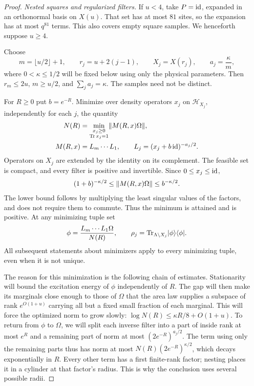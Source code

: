 \begin{proof}
\emph{Nested squares and regularized filters.}
If \(u<4\), take \(P=\operatorname{id}\), expanded in an orthonormal basis on
\(X(u)\).  That set has at most \(81\) sites, so the expansion has
at most \(q^{81}\) terms.  This also covers empty square samples.
We henceforth suppose \(u\geq4\).

Choose
\[
 m=\lfloor u/2\rfloor+1,\qquad
 r_j=u+2(j-1),\qquad X_j=X(r_j),\qquad
 a_j=\frac{\kappa}{m},
\]
where \(0<\kappa\leq1/2\) will be fixed below using only the physical
parameters.  Then \(r_m\leq2u\), \(m\geq u/2\), and
\(\sum_j a_j=\kappa\).  The samples need not be distinct.

For \(R\geq0\) put \(b=e^{-R}\).  Minimize over density operators
\(x_j\) on \(\mathcal H_{X_j}\), independently for each \(j\), the
quantity
\begin{equation}
 \begin{split}
 N(R)&=\min_{\substack{x_j\geq0\\ \operatorname{Tr} x_j=1}}
               \lVert M(R,x)\Omega\rVert,\\
 M(R,x)&=L_m\cdots L_1,\qquad
 L_j=(x_j+b\operatorname{id})^{-a_j/2}.
 \end{split}
 \label{eq:patch-variational-problem}
\end{equation}
Operators on \(X_j\) are extended by the identity on its complement.
The feasible set is compact, and every filter is positive and
invertible.  Since \(0\leq x_j\leq\operatorname{id}\),
\begin{equation}
 (1+b)^{-\kappa/2}
       \leq \lVert M(R,x)\Omega\rVert
       \leq b^{-\kappa/2}.
 \label{eq:patch-elementary-norm-bounds}
\end{equation}
The lower bound follows by multiplying the least singular values of
the factors, and does not require them to commute.  Thus the minimum
is attained and is positive.  At any minimizing tuple set
\[
 \phi=\frac{L_m\cdots L_1\Omega}{N(R)},
 \qquad
 \rho_j=\operatorname{Tr}_{\Lambda\setminus X_j}
                \lvert\phi\rangle\langle\phi\rvert .
\]
All subsequent statements about minimizers apply to every minimizing
tuple, even when it is not unique.

The reason for this minimization is the following chain of estimates.
Stationarity will bound the excitation energy of $\phi$ independently
of $R$.  The gap will then make its marginals close enough to those of
$\Omega$ that the area law supplies a subspace of rank $e^{O(1+u)}$
carrying all but a fixed small fraction of each marginal.  This will force
the optimized norm to grow slowly:
$\log N(R)\le \kappa R/8+O(1+u)$.
To return from $\phi$ to $\Omega$, we will split each inverse filter
into a part of inside rank at most $e^R$ and a remaining part of norm at
most $(2e^{-R})^{a_j/2}$.  The term using only the remaining parts thus
has norm at most $N(R)(2e^{-R})^{\kappa/2}$, which decays exponentially
in $R$.  Every other term has a first finite-rank factor; nesting places
it in a cylinder at that factor's radius.  This is why the conclusion
uses several possible radii.


\end{proof}
